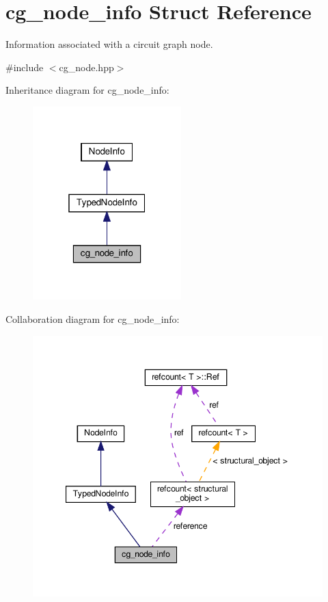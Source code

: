 \hypertarget{structcg__node__info}{}\section{cg\+\_\+node\+\_\+info Struct Reference}
\label{structcg__node__info}


Information associated with a circuit graph node.  




{\ttfamily \#include $<$cg\+\_\+node.\+hpp$>$}



Inheritance diagram for cg\+\_\+node\+\_\+info\+:
\nopagebreak
\begin{figure}[H]
\begin{center}
\leavevmode
\includegraphics[width=163pt]{dd/d27/structcg__node__info__inherit__graph}
\end{center}
\end{figure}


Collaboration diagram for cg\+\_\+node\+\_\+info\+:
\nopagebreak
\begin{figure}[H]
\begin{center}
\leavevmode
\includegraphics[width=347pt]{d6/d76/structcg__node__info__coll__graph}
\end{center}
\end{figure}

